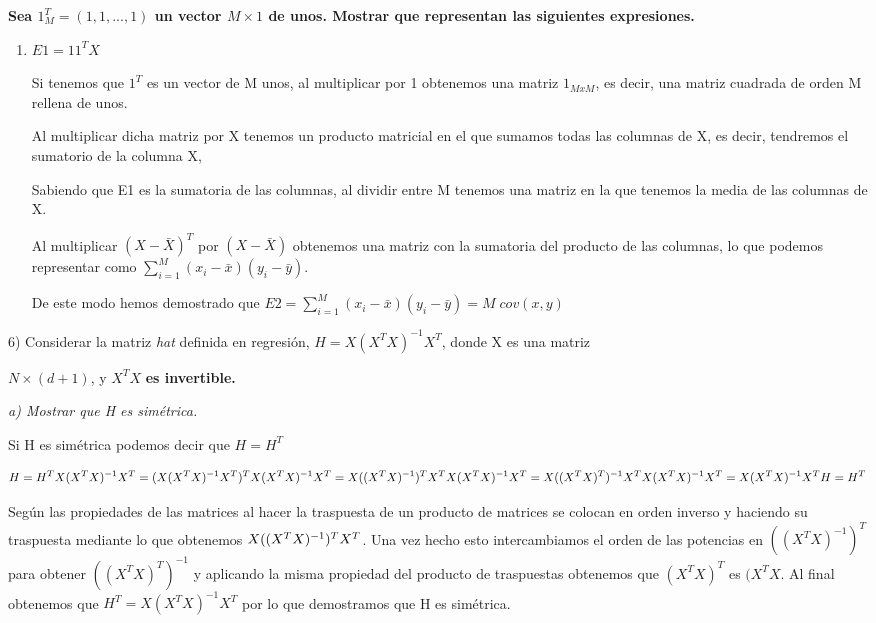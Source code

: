 \documentclass[]{article}
\begin{document}
\textbf{Sea \(1_{M}^T = (1,1,...,1)\) un vector \(M \times 1\) de unos.
Mostrar que representan las siguientes expresiones.}

\begin{enumerate}
\def\labelenumi{\arabic{enumi}.}
\item
  \(E1 = 11^T X\)

  Si tenemos que \(1^T\) es un vector de M unos, al multiplicar por 1
  obtenemos una matriz \(1_{MxM}\), es decir, una matriz cuadrada de
  orden M rellena de unos.

  Al multiplicar dicha matriz por X tenemos un producto matricial en el
  que sumamos todas las columnas de X, es decir,
  tendremos el sumatorio de la columna X,

  Sabiendo que E1 es la sumatoria de las columnas, al dividir entre M
  tenemos una matriz en la que tenemos la media de las columnas de X.

  Al multiplicar \((X - \bar{X})^T\) por \((X - \bar{X})\) obtenemos una
  matriz con la sumatoria del producto de las columnas, lo que podemos
  representar como \(\sum_{i=1}^{M} (x_i-\bar{x})(y_i-\bar{y})\).

  De este modo hemos demostrado que
  \(E2 = \sum_{i=1}^{M} (x_i-\bar{x})(y_i-\bar{y}) = M\;cov(x,y)\)
\end{enumerate}

6) Considerar la matriz \emph{hat} definida en regresión,
\(H = X(X^TX)^{−1}X^T\), donde X es una matriz

\(N × (d + 1)\), y \(X^TX\) \textbf{es invertible.}

\emph{a) Mostrar que H es simétrica.}

 Si H es simétrica podemos decir que \(H = H^T\)

\[H = H^T\\
X(X^TX)^{-1}X^T = (X(X^TX)^{-1}X^T)^T\\
X(X^TX)^{-1}X^T = X ((X^TX)^{-1})^TX^T\\
X(X^TX)^{-1}X^T = X ((X^TX)^T)^{-1}X^T\\
X(X^TX)^{-1}X^T = X(X^TX)^{-1}X^T\\
H = H^T \\\]

 Según las propiedades de las matrices al hacer la traspuesta de un
producto de matrices se colocan en orden inverso y haciendo su
traspuesta mediante lo que obtenemos \(X ((X^TX)^{-1})^TX^T\\\). Una vez
hecho esto intercambiamos el orden de las potencias en
\(((X^TX)^{-1})^T\) para obtener \(((X^TX)^T)^{-1}\) y aplicando la
misma propiedad del producto de traspuestas obtenemos que \((X^TX)^T\)
es \((X^TX\). Al final obtenemos que \(H^T = X(X^TX)^{-1}X^T\) por lo
que demostramos que H es simétrica.
\end{document}
